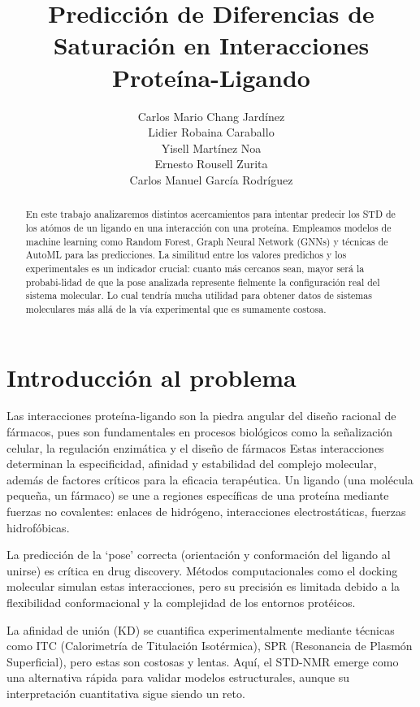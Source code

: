 \documentclass{article}
\title{Predicción de Diferencias de Saturación en Interacciones Proteína-Ligando}
\author{Carlos Mario Chang Jardínez\\Lidier Robaina Caraballo\\Yisell Martínez Noa\\Ernesto Rousell Zurita\\Carlos Manuel García Rodríguez}
\begin{document}
\maketitle

\begin{abstract}
    En este trabajo analizaremos distintos acercamientos para intentar predecir los STD de los atómos de un ligando en una interacción con una proteína.
    Empleamos modelos de machine learning como Random Forest, Graph Neural Network (GNNs) y técnicas de AutoML para las predicciones. La similitud entre
    los valores predichos y los experimentales es un indicador crucial: cuanto más cercanos sean, mayor será la probabi-lidad de que la pose analizada
    represente fielmente la configuración real del sistema molecular. Lo cual tendría mucha utilidad para obtener datos de sistemas moleculares más allá de
    la vía experimental que es sumamente costosa.
\end{abstract}

\newpage

\section{Introducción al problema}
Las interacciones proteína-ligando son la piedra angular del diseño racional de fármacos, pues son fundamentales en procesos biológicos como la señalización celular,
la regulación enzimática y el diseño de fármacos Estas interacciones determinan la especificidad, afinidad y estabilidad del complejo molecular, además de factores críticos
para la eficacia terapéutica. Un ligando (una molécula pequeña, un fármaco) se une a regiones específicas de una proteína mediante fuerzas no covalentes:
enlaces de hidrógeno, interacciones electrostáticas, fuerzas hidrofóbicas.

La predicción de la `pose' correcta (orientación y conformación del ligando al unirse) es crítica en drug discovery. Métodos computacionales como el docking
molecular simulan estas interacciones, pero su precisión es limitada debido a la flexibilidad conformacional y la complejidad de los entornos protéicos\cite{docking}.

La afinidad de unión (KD) se cuantifica experimentalmente mediante técnicas como ITC (Calorimetría de Titulación Isotérmica), SPR (Resonancia de Plasmón Superficial),
pero estas son costosas y lentas. Aquí, el STD-NMR emerge como una alternativa rápida para validar modelos estructurales, aunque su interpretación cuantitativa sigue
siendo un reto\cite{STD_e}.
\end{document}
